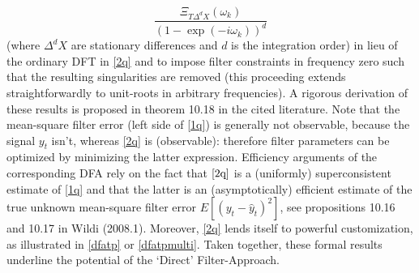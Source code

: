 \documentclass[11pt]{article}
\begin{document}
\[\frac{\Xi_{T\Delta^d{X}}(\omega_k)}{(1-\exp(-i\omega_k))^d}\]
(where $\Delta^d{X}$ are stationary differences and $d$ is the integration order)
in lieu of the ordinary DFT in \ref{2q} and to impose filter constraints in frequency zero such that the resulting singularities are removed (this proceeding extends straightforwardly to unit-roots in arbitrary frequencies). A rigorous derivation of these results is proposed in theorem 10.18 in the cited literature. Note that the mean-square filter error (left side of \ref{1q}) is generally not observable, because the signal $y_t$ isn't, whereas \ref{2q} is (observable): therefore filter parameters can be optimized by minimizing the latter expression. Efficiency arguments of the corresponding DFA rely on the fact that $\ref{2q}$ is a (uniformly) superconsistent estimate of \ref{1q} and that the latter is an (asymptotically) efficient estimate of the true unknown mean-square filter error $E[(y_t-\hat{y}_t)^2]$, see propositions 10.16 and 10.17 in Wildi (2008.1). Moreover, \ref{2q} lends itself to powerful customization, as illustrated in \ref{dfatp} or \ref{dfatpmulti}. Taken together, these formal results underline the potential of the `Direct' Filter-Approach.\\
\end{document}
